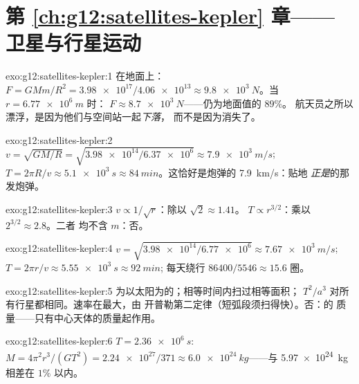 \section*{第 \ref{ch:g12:satellites-kepler} 章——卫星与行星运动}

\begin{solution}{exo:g12:satellites-kepler:1}
在地面上：$F = GMm/R^2 = \num{3.98e17}/\num{4.06e13} \approx
\qty{9.8e3}{N}$。当 $r = \qty{6.77e6}{m}$ 时：
$F \approx \qty{8.7e3}{N}$——仍为地面值的 $89\%$。
航天员之所以漂浮，是因为他们与空间站一起\emph{下落}，
而不是因为消失了。
\end{solution}

\begin{solution}{exo:g12:satellites-kepler:2}
$v = \sqrt{GM/R} = \sqrt{\num{3.98e14}/\num{6.37e6}} \approx
\qty{7.9e3}{m/s}$; $T = 2\pi R/v \approx \qty{5.1e3}{s} \approx
\qty{84}{min}$。这恰好是炮弹的 \qty{7.9}{km/s}：贴地
\emph{正是}的那发炮弹。
\end{solution}

\begin{solution}{exo:g12:satellites-kepler:3}
$v \propto 1/\sqrt{r}$：除以 $\sqrt 2 \approx 1.41$。
$T \propto r^{3/2}$：乘以 $2^{3/2} \approx 2.8$。二者
均不含 $m$：否。
\end{solution}

\begin{solution}{exo:g12:satellites-kepler:4}
$v = \sqrt{\num{3.98e14}/\num{6.77e6}} \approx \qty{7.67e3}{m/s}$;
$T = 2\pi r/v \approx \qty{5.55e3}{s} \approx \qty{92}{min}$;
每天绕行 $\num{86400}/5546 \approx 15.6$ 圈。
\end{solution}

\begin{solution}{exo:g12:satellites-kepler:5}
为以太阳为的；相等时间内扫过相等面积；
$T^2/a^3$ 对所有行星都相同。速率在最大，由
开普勒第二定律（短弧段须扫得快）。否：的
质量——只有中心天体的质量起作用。
\end{solution}

\begin{solution}{exo:g12:satellites-kepler:6}
$T = \qty{2.36e6}{s}$: $M = 4\pi^2 r^3/(GT^2) =
\num{2.24e27}/371 \approx \qty{6.0e24}{kg}$——与
\qty{5.97e24}{kg} 相差在 $1\%$ 以内。
\end{solution}

